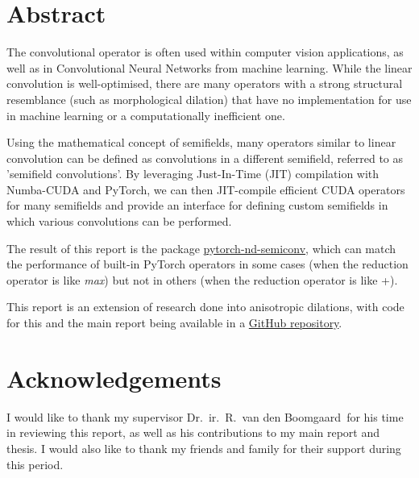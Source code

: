\documentclass[a4paper, 12pt, openright]{report}
\newcommand{\theSupervisor}{Dr.\ ir.\ R.\ van den Boomgaard} %
\begin{document}
\setcounter{page}{1}
\pagestyle{plain} 

\section*{Abstract}
The convolutional operator is often used within computer vision applications, as well as in Convolutional Neural Networks from machine learning. While the linear convolution is well-optimised, there are many operators with a strong structural resemblance (such as morphological dilation) that have no implementation for use in machine learning or a computationally inefficient one.

Using the mathematical concept of semifields, many operators similar to linear convolution can be defined as convolutions in a different semifield, referred to as 'semifield convolutions'.
By leveraging Just-In-Time (JIT) compilation with Numba-CUDA and PyTorch, we can then JIT-compile efficient CUDA operators for many semifields and provide an interface for defining custom semifields in which various convolutions can be performed.

The result of this report is the package \href{https://pypi.org/project/pytorch-nd-semiconv}{\color{cyan}pytorch-nd-semiconv}, which can match the performance of built-in PyTorch operators in some cases (when the reduction operator is like \textit{max}) but not in others (when the reduction operator is like +). 

This report is an extension of research done into anisotropic dilations, with code for this and the main report being available in a \href{https://github.com/p-adema/quadratic-conv}{\color{cyan}GitHub repository}.

  

\vfill
\section*{Acknowledgements}
I would like to thank my supervisor \theSupervisor\ for his time in reviewing this report, as well as his contributions to my main report and thesis. I would also like to thank my friends and family for their support during this period.

\tableofcontents
\end{document}
